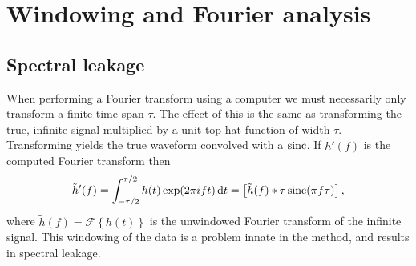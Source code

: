 \chapter{Windowing and Fourier analysis}\label{ap:window}

\section{Spectral leakage}

When performing a Fourier transform using a computer we must necessarily only transform a finite time-span $\tau$. The effect of this is the same as transforming the true, infinite signal multiplied by a unit top-hat function of width $\tau$. Transforming yields the true waveform convolved with a $\operatorname{sinc}$. If $\tilde{h}'(f)$ is the computed Fourier transform then
\begin{equation}
\tilde{h}'(f) = \int_{-\tau/2}^{\tau/2}{h(t)\exp({2\pi i ft})}\,\mathrm{d}{t} = \left[\tilde{h}(f) \ast \tau \operatorname{sinc}(\pi f\tau)\right],
\end{equation}
where $\tilde{h}(f) = \mathscr{F}\left\{h(t)\right\}$ is the unwindowed Fourier transform of the infinite signal. This windowing of the data is a problem innate in the method, and results in spectral leakage.

